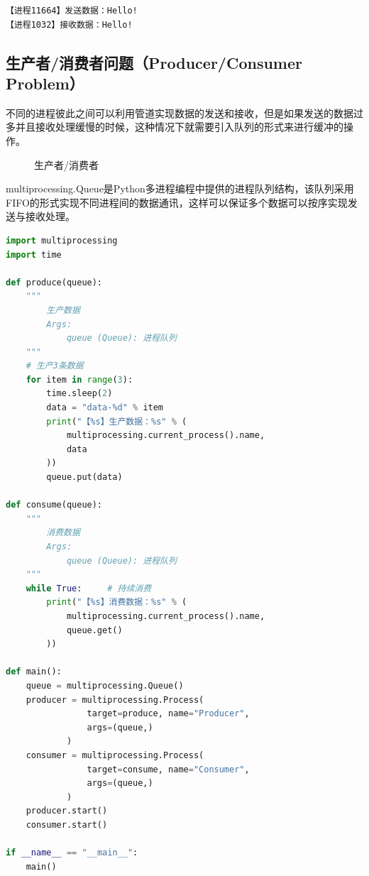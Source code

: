 \begin{tcolorbox}
    \begin{verbatim}
【进程11664】发送数据：Hello!
【进程1032】接收数据：Hello!
	\end{verbatim}
\end{tcolorbox}

\vspace{0.5cm}

\subsection{生产者/消费者问题（Producer/Consumer Problem）}

不同的进程彼此之间可以利用管道实现数据的发送和接收，但是如果发送的数据过多并且接收处理缓慢的时候，这种情况下就需要引入队列的形式来进行缓冲的操作。

\begin{figure}[H]
    \centering
    \caption{生产者/消费者}
\end{figure}

multiprocessing.Queue是Python多进程编程中提供的进程队列结构，该队列采用FIFO的形式实现不同进程间的数据通讯，这样可以保证多个数据可以按序实现发送与接收处理。\\


\begin{lstlisting}[language=Python]
import multiprocessing
import time

def produce(queue):
	"""
		生产数据
		Args:
			queue (Queue): 进程队列
	"""
	# 生产3条数据
	for item in range(3):
		time.sleep(2)
		data = "data-%d" % item
		print("【%s】生产数据：%s" % (
			multiprocessing.current_process().name,
			data
		))
		queue.put(data)

def consume(queue):
	"""
		消费数据
		Args:
			queue (Queue): 进程队列
	"""
	while True:     # 持续消费
		print("【%s】消费数据：%s" % (
			multiprocessing.current_process().name,
			queue.get()
		))

def main():
	queue = multiprocessing.Queue()
	producer = multiprocessing.Process(
				target=produce, name="Producer",
				args=(queue,)
			)
	consumer = multiprocessing.Process(
				target=consume, name="Consumer",
				args=(queue,)
			)
	producer.start()
	consumer.start()

if __name__ == "__main__":
	main()
\end{lstlisting}


